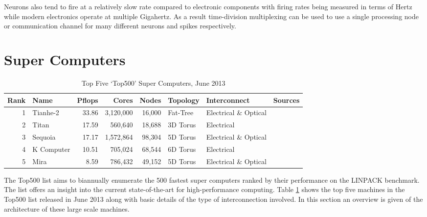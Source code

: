 			Neurons also tend to fire at a relatively slow rate compared to electronic
			components with firing rates being measured in terms of Hertz while modern
			electronics operate at multiple Gigahertz. As a result time-division
			multiplexing can be used to use a single processing node or communication
			channel for many different neurons and spikes respectively.
	
	
	\section{Super Computers}
		
		\label{sec:super-computers}
		
		\begin{table}
			\center
			\begin{tabular}{r l r r r l l l}
				\toprule
				Rank & Name    & Pflops& Cores  & Nodes  & Topology & Interconnect          & Sources \\
				\midrule                          
				1 & Tianhe-2   & 33.86 & 3,120,000 & 16,000 & Fat-Tree & Electrical \& Optical & \cite{dongarra13} \\
				2 & Titan      & 17.59 & 560,640   & 18,688 & 3D Torus & Electrical            & \cite{bland12} \\
				3 & Sequoia    & 17.17 & 1,572,864 & 98,304 & 5D Torus & Electrical \& Optical & \cite{prickett10} \\
				4 & K Computer & 10.51 & 705,024   & 68,544 & 6D Torus & Electrical            & \cite{fujitsu11,yokokawa11} \\
				5 & Mira       &  8.59 & 786,432   & 49,152 & 5D Torus & Electrical \& Optical & \cite{prickett10} \\
				\bottomrule
			\end{tabular}
			
			\caption{Top Five `Top500' Super Computers, June 2013 \cite{meuer13}}
			\label{tab:top500}
		\end{table}
		
		The Top500 list \cite{meuer13} aims to biannually enumerate the 500 fastest
		super computers ranked by their performance on the LINPACK
		\cite{dongarraLINPAC} benchmark. The list offers an insight into the current
		state-of-the-art for high-performance computing. Table \ref{tab:top500}
		shows the top five machines in the Top500 list released in June 2013 along
		with basic details of the type of interconnection involved. In this section
		an overview is given of the architecture of these large scale machines.
		
